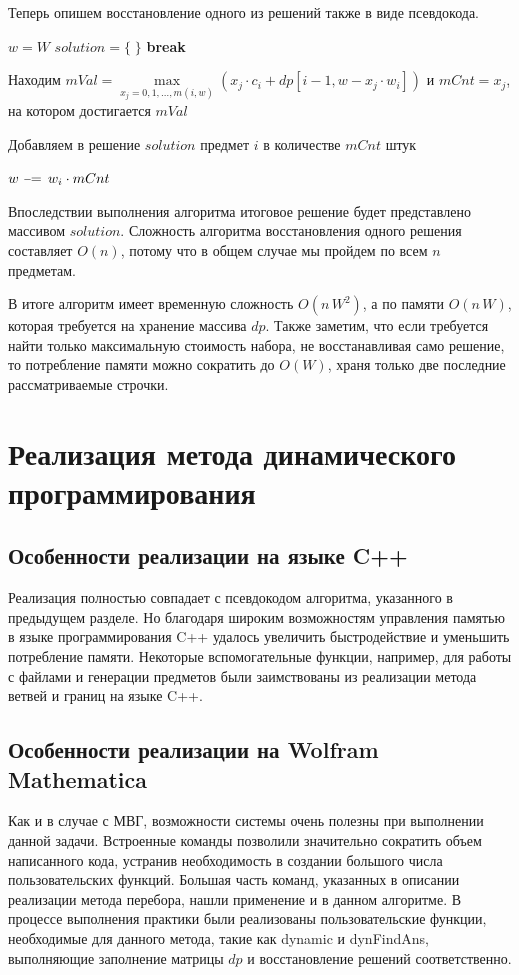 \documentclass[12pt, a4paper]{article}
\newcommand{\algorithmicbreak}{\textbf{break}}
\newcommand{\Break}{\State \algorithmicbreak}
\begin{document}
	Теперь опишем восстановление одного из решений также в виде псевдокода.
	\begin{algorithmic}[1]
		\State $w = W$
		\State $solution = \{\;\}$
		\Break
		\EndIf
		\State \parbox[t]{\dimexpr12cm-\algorithmicindent}{Находим $mVal = \max\limits_{x_j = 0,1,\dots, m(i,w)} \left(x_j\cdot c_i + dp[i-1, w - x_j\cdot w_i]\right)$ и $mCnt = x_j$, на котором достигается $mVal$}
		\If{$mCnt \ne 0$}
		\State \parbox[t]{\dimexpr11.5cm-\algorithmicindent}{Добавляем в решение $solution$ предмет $i$ в количестве $mCnt$ штук}
		\State $w\,\,\scalebox{0.75}[1.0]{\(-\)}\!\!=\, w_i \cdot mCnt$
		\EndIf
		\EndFor
	\end{algorithmic}
	
	Впоследствии выполнения алгоритма итоговое решение будет представлено массивом $solution$. Сложность алгоритма восстановления одного решения составляет $O(n)$, потому что в общем случае мы пройдем по всем $n$ предметам.
	
	В итоге алгоритм имеет временную сложность $O(n\,W^2)$, а по памяти $O(n\,W)$, которая требуется на хранение массива $dp$. Также заметим, что если требуется найти только максимальную стоимость набора, не восстанавливая само решение, то потребление памяти можно сократить до $O(W)$, храня только две последние рассматриваемые строчки.
	
	\section{Реализация метода динамического программирования}
	
	\subsection{Особенности реализации на языке C++}
	Реализация полностью совпадает с псевдокодом алгоритма, указанного в предыдущем разделе. Но благодаря широким возможностям управления памятью в языке программирования C++ удалось увеличить быстродействие и уменьшить потребление	памяти. Некоторые вспомогательные функции, например, для работы с файлами и генерации предметов были заимствованы из реализации метода ветвей и границ на языке C++.
	
	\subsection{Особенности реализации на Wolfram Mathematica}
	Как и в случае с МВГ, возможности системы очень полезны при выполнении данной задачи. Встроенные команды позволили значительно сократить объем написанного кода, устранив необходимость в создании большого числа пользовательских функций. Большая часть команд, указанных в описании реализации метода перебора, нашли применение и в данном алгоритме. В процессе выполнения практики были реализованы пользовательские функции, необходимые для данного метода, такие как dynamic и dynFindAns, выполняющие заполнение матрицы $dp$ и восстановление решений соответственно.
	
\end{document}
